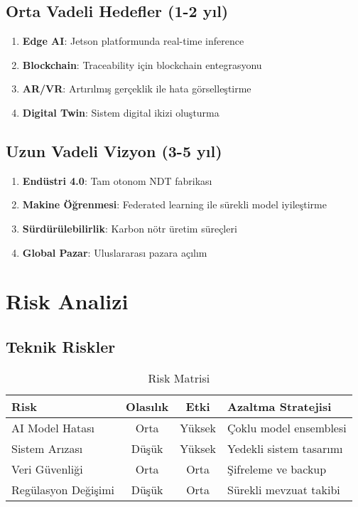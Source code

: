 \documentclass[12pt,a4paper]{article}
\begin{document}
\subsection{Orta Vadeli Hedefler (1-2 yıl)}

\begin{enumerate}
    \item \textbf{Edge AI}: Jetson platformunda real-time inference
    \item \textbf{Blockchain}: Traceability için blockchain entegrasyonu
    \item \textbf{AR/VR}: Artırılmış gerçeklik ile hata görselleştirme
    \item \textbf{Digital Twin}: Sistem digital ikizi oluşturma
\end{enumerate}

\subsection{Uzun Vadeli Vizyon (3-5 yıl)}

\begin{enumerate}
    \item \textbf{Endüstri 4.0}: Tam otonom NDT fabrikası
    \item \textbf{Makine Öğrenmesi}: Federated learning ile sürekli model iyileştirme
    \item \textbf{Sürdürülebilirlik}: Karbon nötr üretim süreçleri
    \item \textbf{Global Pazar}: Uluslararası pazara açılım
\end{enumerate}

\section{Risk Analizi}

\subsection{Teknik Riskler}

\begin{table}[H]
    \centering
    \caption{Risk Matrisi}
    \begin{tabular}{lccl}
        \toprule
        \textbf{Risk} & \textbf{Olasılık} & \textbf{Etki} & \textbf{Azaltma Stratejisi} \\
        \midrule
        AI Model Hatası & Orta & Yüksek & Çoklu model ensemblesi \\
        Sistem Arızası & Düşük & Yüksek & Yedekli sistem tasarımı \\
        Veri Güvenliği & Orta & Orta & Şifreleme ve backup \\
        Regülasyon Değişimi & Düşük & Orta & Sürekli mevzuat takibi \\
        \bottomrule
    \end{tabular}
    \label{tab:risk_matrix}
\end{table}
\end{document}
